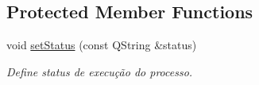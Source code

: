 \subsection*{Protected Member Functions}
\begin{DoxyCompactItemize}
\item 
\hypertarget{class_process_control_a1f47b0f6a1af3369f3feb1eabbe85543}{}void \hyperlink{class_process_control_a1f47b0f6a1af3369f3feb1eabbe85543}{set\+Status} (const Q\+String \&status)\label{class_process_control_a1f47b0f6a1af3369f3feb1eabbe85543}

\begin{DoxyCompactList}\small\item\em Define status de execução do processo. \end{DoxyCompactList}\end{DoxyCompactItemize}
